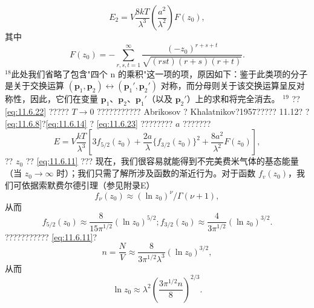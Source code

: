 \begin{equation}\tag{11.6.32}\label{eq:11.6.32}
E _ { 2 } = V \frac { 8 k T } { \lambda ^{3} } \left( \frac { a ^{2} } { \lambda ^{2} } \right) F ( z _ { 0 } ) ,
\end{equation}
其中
\begin{equation}\tag{11.6.33}\label{eq:11.6.33}
F ( z _ { 0 } ) = - \sum _ { r , s , t = 1 } ^{\infty} \frac { ( - z _ { 0 } ) ^{r + s + t} } { \sqrt { ( r s t ) ( r + s ) ( r + t ) } } .
\end{equation}
\(^{18}\)此处我们省略了包含"四个 n 的乘积"这一项的项，原因如下：鉴于此类项的分子是关于交换运算 \((\boldsymbol{p}_1, \boldsymbol{p}_2) \leftrightarrow (\boldsymbol{p}_1', \boldsymbol{p}_2')\) 对称，而分母则关于该交换运算呈反对称性，因此，它们在变量 \(\boldsymbol{p}_1\)、\(\boldsymbol{p}_2\)、\(\boldsymbol{p}_1'\)（以及 \(\boldsymbol{p}_2'\)）上的求和将完全消去。
\(^{19}\) ?? \autoref{eq:11.6.22} ????? \(T \rightarrow 0\) ??????????? Abrikosov ? Khalatnikov?1957????? 11.12?
? \autoref{eq:11.6.8}?\autoref{eq:11.6.14} ? \autoref{eq:11.6.23} ???????? \(a\) ???????
\begin{equation}\tag{11.6.34}\label{eq:11.6.34}
E = V \frac { k T } { \lambda ^{3} } \left[ 3 f _ { 5 / 2 } ( z _ { 0 } ) + \frac { 2 a } { \lambda } \{ f _ { 3 / 2 } ( z _ { 0 } ) \} ^{2} + \frac { 8 a ^{2} } { \lambda ^{2} } F ( z _ { 0 } ) \right] ,
\end{equation}
?? \(z_{0}\) ?? \autoref{eq:11.6.11} ???
现在，我们很容易就能得到不完美费米气体的基态能量（当 \(z_0 \to \infty\) 时）；我们只需了解所涉及函数的渐近行为。对于函数 \(f_v(z_0)\)，我们可依据索默费尔德引理（参见附录E）
\begin{equation}\tag{11.6.35}\label{eq:11.6.35}
f _ { \nu } ( z _ { 0 } ) \approx ( \ln z _ { 0 } ) ^{\nu} / \Gamma ( \nu + 1 ) ,
\end{equation}
从而
\begin{equation}\tag{11.6.36}\label{eq:11.6.36}
f _ { 5 / 2 } ( z _ { 0 } ) \approx \frac { 8 } { 15 \pi ^{1 / 2} } ( \ln z _ { 0 } ) ^{5 / 2} ;  f _ { 3 / 2 } ( z _ { 0 } ) \approx \frac { 4 } { 3 \pi ^{1 / 2} } ( \ln z _ { 0 } ) ^{3 / 2} .
\end{equation}
??????????? \autoref{eq:11.6.11}?
\begin{equation}\tag{11.6.37}\label{eq:11.6.37}
n = \frac { N } { V } \approx \frac { 8 } { 3 \pi ^{1 / 2} \lambda ^{3} } ( \ln z _ { 0 } ) ^{3 / 2} ,
\end{equation}
从而
\begin{equation}\tag{11.6.38}\label{eq:11.6.38}
\ln z _ { 0 } \approx \lambda ^{2} \left( \frac { 3 \pi ^{1 / 2} n } { 8 } \right) ^{2 / 3} .
\end{equation}
